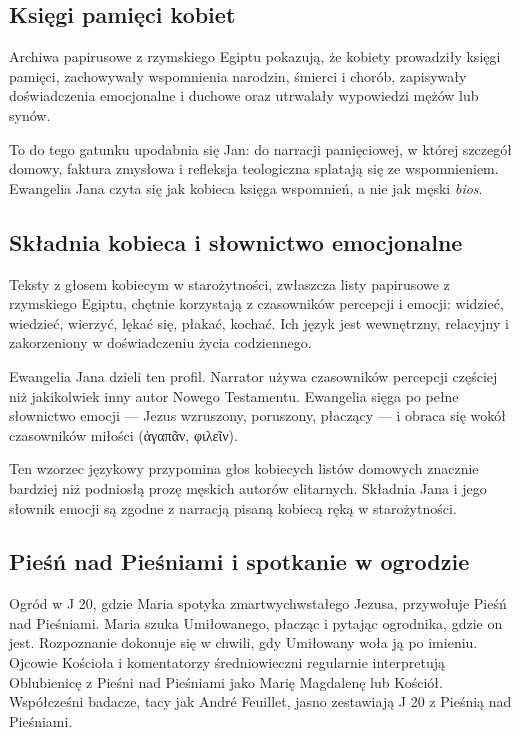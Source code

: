 \subsection{Księgi pamięci kobiet}\label{subsec:womens-memory-books}

Archiwa papirusowe z rzymskiego Egiptu pokazują, że kobiety prowadziły księgi pamięci, zachowywały wspomnienia narodzin, śmierci i chorób, zapisywały doświadczenia emocjonalne i duchowe oraz utrwalały wypowiedzi mężów lub synów.

To do tego gatunku upodabnia się Jan:
do narracji pamięciowej, w której szczegół domowy, faktura zmysłowa i refleksja teologiczna splatają się ze wspomnieniem.
Ewangelia Jana czyta się jak kobieca księga wspomnień, a nie jak męski \textit{bios}.

\subsection{Składnia kobieca i słownictwo emocjonalne}\label{subsec:feminine-syntax}

Teksty z głosem kobiecym w starożytności, zwłaszcza listy papirusowe z rzymskiego Egiptu, chętnie korzystają z czasowników percepcji i emocji: widzieć, wiedzieć, wierzyć, lękać się, płakać, kochać.
Ich język jest wewnętrzny, relacyjny i zakorzeniony w doświadczeniu życia codziennego.

Ewangelia Jana dzieli ten profil.
Narrator używa czasowników percepcji częściej niż jakikolwiek inny autor Nowego Testamentu.
Ewangelia sięga po pełne słownictwo emocji — Jezus wzruszony, poruszony, płaczący — i obraca się wokół czasowników miłości (\textgreek{ἀγαπᾶν}, \textgreek{φιλεῖν}).

Ten wzorzec językowy przypomina głos kobiecych listów domowych znacznie bardziej niż podniosłą prozę męskich autorów elitarnych.
Składnia Jana i jego słownik emocji są zgodne z narracją pisaną kobiecą ręką w starożytności.

\subsection{Pieśń nad Pieśniami i spotkanie w ogrodzie}\label{subsec:song-of-songs}

Ogród w J 20, gdzie Maria spotyka zmartwychwstałego Jezusa, przywołuje Pieśń nad Pieśniami.
Maria szuka Umiłowanego, płacząc i pytając ogrodnika, gdzie on jest.
Rozpoznanie dokonuje się w chwili, gdy Umiłowany woła ją po imieniu.
Ojcowie Kościoła i komentatorzy średniowieczni regularnie interpretują Oblubienicę z Pieśni nad Pieśniami jako Marię Magdalenę lub Kościół.
Współcześni badacze, tacy jak André Feuillet, jasno zestawiają J 20 z Pieśnią nad Pieśniami.

